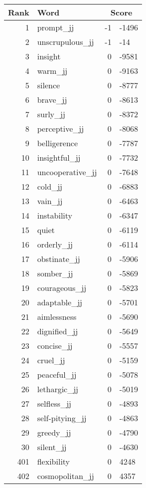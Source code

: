 \begin{longtable}[!htbp]{| rlr@{.}l |}
    \hline
    \textbf{Rank} & \textbf{Word} & \multicolumn{2}{c|}{\textbf{Score}} \\
    \hline
    \endhead
    1 & prompt\_jj & -1 & -1496 \\
    2 & unscrupulous\_jj & -1 & -14 \\
    3 & insight & 0 & -9581 \\
    4 & warm\_jj & 0 & -9163 \\
    5 & silence & 0 & -8777 \\
    6 & brave\_jj & 0 & -8613 \\
    7 & surly\_jj & 0 & -8372 \\
    8 & perceptive\_jj & 0 & -8068 \\
    9 & belligerence & 0 & -7787 \\
    10 & insightful\_jj & 0 & -7732 \\
    11 & uncooperative\_jj & 0 & -7648 \\
    12 & cold\_jj & 0 & -6883 \\
    13 & vain\_jj & 0 & -6463 \\
    14 & instability & 0 & -6347 \\
    15 & quiet & 0 & -6119 \\
    16 & orderly\_jj & 0 & -6114 \\
    17 & obstinate\_jj & 0 & -5906 \\
    18 & somber\_jj & 0 & -5869 \\
    19 & courageous\_jj & 0 & -5823 \\
    20 & adaptable\_jj & 0 & -5701 \\
    21 & aimlessness & 0 & -5690 \\
    22 & dignified\_jj & 0 & -5649 \\
    23 & concise\_jj & 0 & -5557 \\
    24 & cruel\_jj & 0 & -5159 \\
    25 & peaceful\_jj & 0 & -5078 \\
    26 & lethargic\_jj & 0 & -5019 \\
    27 & selfless\_jj & 0 & -4893 \\
    28 & self-pitying\_jj & 0 & -4863 \\
    29 & greedy\_jj & 0 & -4790 \\
    30 & silent\_jj & 0 & -4630 \\
    401 & flexibility & 0 & 4248 \\
    402 & cosmopolitan\_jj & 0 & 4357 \\

\end{longtable}
